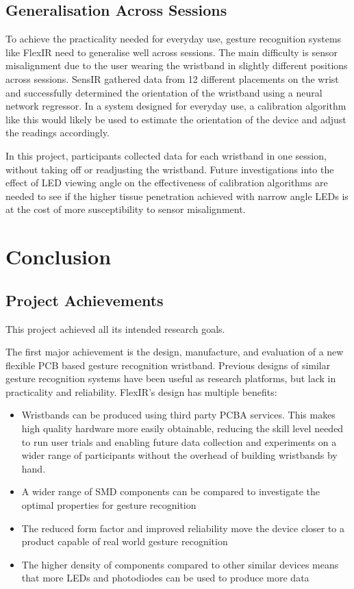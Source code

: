 \documentclass[ oneside,%
                    author={Jack Jarvis},
                    degree={BSc},
                     title={FlexIR: Flexible PCB Wristbands for Infrared Based Gesture Recognition},
                    unit={COMS30045},
                    subtitle={Investigating the Effect of LED Viewing Angle on Gesture Classification in Infrared Sensing Systems}]{dissertation}
\begin{document}
\section{Generalisation Across Sessions}
To achieve the practicality needed for everyday use, gesture recognition systems like FlexIR need to generalise well across sessions. The main difficulty is sensor misalignment due to the user wearing the wristband in slightly different positions across sessions. SensIR\cite{McIntosh2017SensIR:Reflection} gathered data from 12 different placements on the wrist and successfully determined the orientation of the wristband using a neural network regressor. In a system designed for everyday use, a calibration algorithm like this would likely be used to estimate the orientation of the device and adjust the readings accordingly.

In this project, participants collected data for each wristband in one session, without taking off or readjusting the wristband. Future investigations into the effect of LED viewing angle on the effectiveness of calibration algorithms are needed to see if the higher tissue penetration achieved with narrow angle LEDs is at the cost of more susceptibility to sensor misalignment.

\chapter{Conclusion}
\label{chap:conclusion}

\section{Project Achievements}
\noindent
This project achieved all its intended research goals.

The first major achievement is the design, manufacture, and evaluation of a new flexible PCB based gesture recognition wristband. Previous designs of similar gesture recognition systems have been useful as research platforms, but lack in practicality and reliability. FlexIR's design has multiple benefits:
\begin{itemize}
    \item Wristbands can be produced using third party PCBA services. This makes high quality hardware more easily obtainable, reducing the skill level needed to run user trials and enabling future data collection and experiments on a wider range of participants without the overhead of building wristbands by hand.
    \item A wider range of SMD components can be compared to investigate the optimal properties for gesture recognition
    \item The reduced form factor and improved reliability move the device closer to a product capable of real world gesture recognition
    \item The higher density of components compared to other similar devices means that more LEDs and photodiodes can be used to produce more data
\end{itemize}
\end{document}
